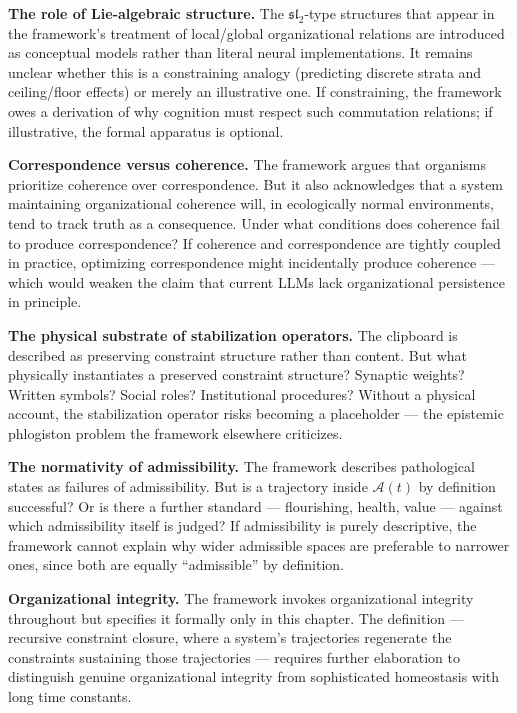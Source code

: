 \documentclass[12pt,oneside]{book}
\theoremstyle{plain}
\theoremstyle{definition}
\theoremstyle{plain}
\begin{document}
\textbf{The role of Lie-algebraic structure.} The $\mathfrak{sl}_2$-type structures that appear in the framework's treatment of local/global organizational relations are introduced as conceptual models rather than literal neural implementations. It remains unclear whether this is a constraining analogy (predicting discrete strata and ceiling/floor effects) or merely an illustrative one. If constraining, the framework owes a derivation of why cognition must respect such commutation relations; if illustrative, the formal apparatus is optional.

\textbf{Correspondence versus coherence.} The framework argues that organisms prioritize coherence over correspondence. But it also acknowledges that a system maintaining organizational coherence will, in ecologically normal environments, tend to track truth as a consequence. Under what conditions does coherence fail to produce correspondence? If coherence and correspondence are tightly coupled in practice, optimizing correspondence might incidentally produce coherence — which would weaken the claim that current LLMs lack organizational persistence in principle.

\textbf{The physical substrate of stabilization operators.} The clipboard is described as preserving constraint structure rather than content. But what physically instantiates a preserved constraint structure? Synaptic weights? Written symbols? Social roles? Institutional procedures? Without a physical account, the stabilization operator risks becoming a placeholder — the epistemic phlogiston problem the framework elsewhere criticizes.

\textbf{The normativity of admissibility.} The framework describes pathological states as failures of admissibility. But is a trajectory inside $\mathcal{A}(t)$ by definition successful? Or is there a further standard — flourishing, health, value — against which admissibility itself is judged? If admissibility is purely descriptive, the framework cannot explain why wider admissible spaces are preferable to narrower ones, since both are equally ``admissible'' by definition.

\textbf{Organizational integrity.} The framework invokes organizational integrity throughout but specifies it formally only in this chapter. The definition — recursive constraint closure, where a system's trajectories regenerate the constraints sustaining those trajectories — requires further elaboration to distinguish genuine organizational integrity from sophisticated homeostasis with long time constants.
\end{document}
